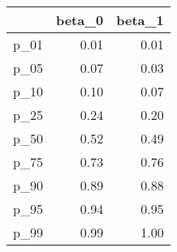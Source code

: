 \begin{table}[ht]
\centering
\begin{tabular}{rrr}
  \hline
 & beta\_0 & beta\_1 \\ 
  \hline
p\_01 & 0.01 & 0.01 \\ 
  p\_05 & 0.07 & 0.03 \\ 
  p\_10 & 0.10 & 0.07 \\ 
  p\_25 & 0.24 & 0.20 \\ 
  p\_50 & 0.52 & 0.49 \\ 
  p\_75 & 0.73 & 0.76 \\ 
  p\_90 & 0.89 & 0.88 \\ 
  p\_95 & 0.94 & 0.95 \\ 
  p\_99 & 0.99 & 1.00 \\ 
   \hline
\end{tabular}
\end{table}
